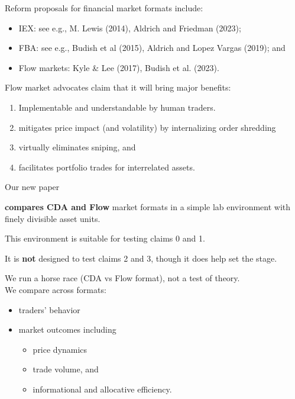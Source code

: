 \documentclass[10pt]{beamer}
\begin{document}
\begin{frame}{Reform proposals}
for financial market formats include:
    \begin{itemize}
\item IEX: see e.g., M. Lewis (2014), Aldrich and Friedman (2023); %
\item FBA: see e.g., Budish et al (2015), Aldrich and Lopez Vargas (2019); and %
\item Flow markets:  Kyle \& Lee (2017), Budish et al. (2023).
\end{itemize}
\end{frame}

\begin{frame}{Flow market advocates claim}
that it will bring major benefits:
\begin{enumerate}
\item[0.] Implementable and understandable by human traders.
\item mitigates price impact 
(and volatility) by internalizing order shredding %
\item virtually eliminates sniping, and %
\item facilitates portfolio trades for interrelated assets.
\end{enumerate}
\end{frame}



\begin{frame}{Our new paper}

\textbf{compares CDA and Flow} market formats in a simple lab environment  with finely divisible asset units. 

This environment is 
suitable for testing claims 0 and 1.

It is \textbf{not} designed to test claims 2 and 3, though it does help set the stage. %

\bigskip

We run a horse race (CDA vs Flow format), not a test of theory.\\ %
We compare across formats:
\begin{itemize}
\item traders' behavior %
\item market outcomes including 
\begin{itemize}
    \item price dynamics %
\item trade volume, and %
\item informational and allocative efficiency. 
\end{itemize} 
\end{itemize}


\end{frame}
\end{document}
